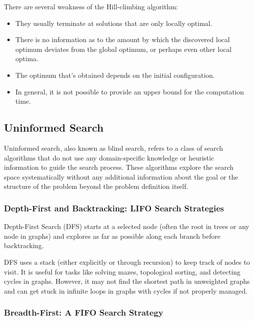            There are several weakness of the Hill-climbing algorithm:

            \begin{itemize}
                \item They usually terminate at solutions that are only locally optimal.
                \item There is no information as to the amount by which the discovered local optimum deviates from the global optimum, or perhaps even other local optima.
                \item The optimum that's obtained depends on the initial configuration.
                \item In general, it is not possible to provide an upper bound for the computation time.
            \end{itemize}

        \subsection{Uninformed Search}
            Uninformed search, also known as blind search, refers to a class of search algorithms that do not use any domain-specific knowledge or heuristic information to guide the search process. These algorithms explore the search space systematically without any additional information about the goal or the structure of the problem beyond the problem definition itself.

            \subsubsection{Depth-First and Backtracking: LIFO Search Strategies}

                Depth-First Search (DFS) starts at a selected node (often the root in trees or any node in graphs) and explores as far as possible along each branch before backtracking. 

                DFS uses a stack (either explicitly or through recursion) to keep track of nodes to visit. It is useful for tasks like solving mazes, topological sorting, and detecting cycles in graphs. However, it may not find the shortest path in unweighted graphs and can get stuck in infinite loops in graphs with cycles if not properly managed.

            \subsubsection{Breadth-First: A FIFO Search Strategy}

